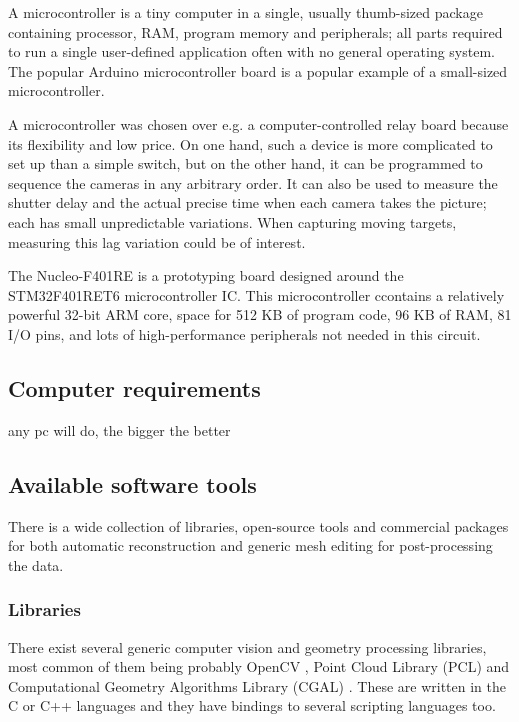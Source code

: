 A microcontroller is a tiny computer in a single, usually thumb-sized package containing processor, RAM, program memory and peripherals; all parts required to run a single user-defined application often with no general operating system.
The popular Arduino microcontroller board is a popular example of a small-sized microcontroller.

A microcontroller was chosen over e.g. a computer-controlled relay board because its flexibility and low price.
On one hand, such a device is more complicated to set up than a simple switch, but on the other hand, it can be programmed to sequence the cameras in any arbitrary order.
It can also be used to measure the shutter delay and the actual precise time when each camera takes the picture; each has small unpredictable variations.
When capturing moving targets, measuring this lag variation could be of interest.

The Nucleo-F401RE is a prototyping board designed around the STM32F401RET6 microcontroller IC.
This microcontroller ccontains a relatively powerful 32-bit ARM core, space for 512 KB of program code, 96 KB of RAM, 81 I/O pins, and lots of high-performance peripherals not needed in this circuit.


\subsection{Computer requirements} %

any pc will do, the bigger the better


\subsection{Available software tools}

 There is a wide collection of libraries, open-source tools and commercial packages for both automatic reconstruction and generic mesh editing for post-processing the data.

\subsubsection{Libraries} %

There exist several generic computer vision and geometry processing libraries, most common of them being probably OpenCV \cite{opencv}, Point Cloud Library (PCL) \cite{pcl} and Computational Geometry Algorithms Library (CGAL) \cite{cgal}. These are written in the C or C++ languages and they have bindings to several scripting languages too.

